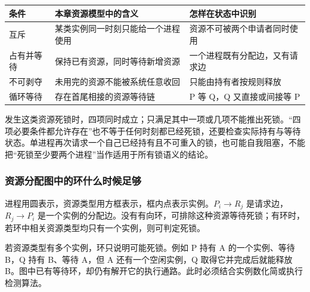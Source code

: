 \begin{wideblock}

\par\medskip\noindent\begin{minipage}{\linewidth}\fontsize{9.3}{12}\selectfont\begin{tabularx}{\linewidth}{@{}YYY@{}}
\toprule\noalign{}
\begin{minipage}[b]{\linewidth}\raggedright
条件
\end{minipage} & \begin{minipage}[b]{\linewidth}\raggedright
本章资源模型中的含义
\end{minipage} & \begin{minipage}[b]{\linewidth}\raggedright
怎样在状态中识别
\end{minipage} \\
\midrule\noalign{}


互斥 & 某类实例同一时刻只能给一个进程使用 & 资源不可被两个申请者同时使用 \\
占有并等待 & 保持已有资源，同时等待新增资源 & 一个进程既有分配边，又有请求边 \\
不可剥夺 & 未用完的资源不能被系统任意收回 & 只能由持有者按规则释放 \\
循环等待 & 存在首尾相接的资源等待链 & P 等 Q，Q 又直接或间接等 P \\
\bottomrule\end{tabularx}
\end{minipage}\par\medskip

\end{wideblock}

发生这类资源死锁时，四项同时成立；只满足其中一项或几项不能推出死锁。``四项必要条件都允许存在''也不等于任何时刻都已经死锁，还要检查实际持有与等待状态。单进程再次请求一个自己已经持有且不可重入的锁，也可能自我阻塞，不能把``死锁至少要两个进程''当作适用于所有锁语义的结论。

\subsubsection{资源分配图中的环什么时候足够}\label{OS02-auto-24}

进程用圆表示，资源类型用方框表示，框内点表示实例。\(P_i\to R_j\) 是请求边，\(R_j\to P_i\) 是一个实例的分配边。没有有向环，可排除这种资源等待死锁；有环时，若环中相关资源类型均只有一个实例，则可判定死锁。

若资源类型有多个实例，环只说明可能死锁。例如 P 持有 A 的一个实例、等待 B，Q 持有 B、等待 A，但 A 还有一个空闲实例，Q 取得它并完成后就能释放 B。图中已有等待环，却仍有解开它的执行通路。此时必须结合实例数化简或执行检测算法。

